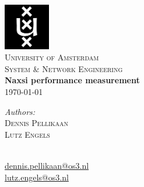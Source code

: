 \documentclass{article}
\begin{document}
\begin{titlepage}
\begin{center}
\includegraphics[width=0.15\textwidth]{images/uva-logo.png}\\[1cm]
\textsc{\LARGE University of Amsterdam}\\[0.5cm]
\textsc{\Large System \& Network Engineering}\\[2cm]
{\huge \bfseries Naxsi performance measurement}\\[0.2cm]
{\large \today}\\
\end{center}
\vfill
\begin{minipage}[t]{0.4\textwidth}
\begin{flushleft} \large
\emph{Authors:}\\
\textsc{Dennis Pellikaan}\\
\textsc{Lutz Engels}\\[1cm]
\end{flushleft}
\end{minipage}
\begin{minipage}[t]{0.4\textwidth}
\begin{flushright} \large
\mbox{ }\\
\href{mailto:dennis.pellikaan@os3.nl}{dennis.pellikaan@os3.nl}\\
\href{mailto:lutz.engels@os3.nl}{lutz.engels@os3.nl}
\end{flushright}
\end{minipage}
\end{titlepage}

\pagestyle{empty}

\newpage
\tableofcontents
\newpage
\pagestyle{plain}
\setcounter{page}{1}







\appendix





%
\end{document}
